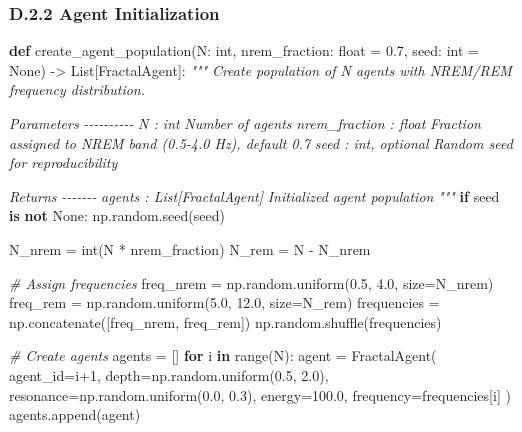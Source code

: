 \documentclass[
]{article}
\newenvironment{Shaded}{}{}
\newcommand{\BuiltInTok}[1]{\textcolor[rgb]{0.00,0.50,0.00}{#1}}
\newcommand{\CommentTok}[1]{\textcolor[rgb]{0.38,0.63,0.69}{\textit{#1}}}
\newcommand{\ControlFlowTok}[1]{\textcolor[rgb]{0.00,0.44,0.13}{\textbf{#1}}}
\newcommand{\DecValTok}[1]{\textcolor[rgb]{0.25,0.63,0.44}{#1}}
\newcommand{\FloatTok}[1]{\textcolor[rgb]{0.25,0.63,0.44}{#1}}
\newcommand{\KeywordTok}[1]{\textcolor[rgb]{0.00,0.44,0.13}{\textbf{#1}}}
\newcommand{\NormalTok}[1]{#1}
\newcommand{\OperatorTok}[1]{\textcolor[rgb]{0.40,0.40,0.40}{#1}}
\newcommand{\VariableTok}[1]{\textcolor[rgb]{0.10,0.09,0.49}{#1}}
\begin{document}
\subsubsection{D.2.2 Agent
Initialization}\label{d.2.2-agent-initialization}

\begin{Shaded}
\begin{Highlighting}[]
\KeywordTok{def}\NormalTok{ create\_agent\_population(N: }\BuiltInTok{int}\NormalTok{,}
\NormalTok{                           nrem\_fraction: }\BuiltInTok{float} \OperatorTok{=} \FloatTok{0.7}\NormalTok{,}
\NormalTok{                           seed: }\BuiltInTok{int} \OperatorTok{=} \VariableTok{None}\NormalTok{) }\OperatorTok{{-}\textgreater{}}\NormalTok{ List[FractalAgent]:}
    \CommentTok{"""}
\CommentTok{    Create population of N agents with NREM/REM frequency distribution.}

\CommentTok{    Parameters}
\CommentTok{    {-}{-}{-}{-}{-}{-}{-}{-}{-}{-}}
\CommentTok{    N : int}
\CommentTok{        Number of agents}
\CommentTok{    nrem\_fraction : float}
\CommentTok{        Fraction assigned to NREM band (0.5{-}4.0 Hz), default 0.7}
\CommentTok{    seed : int, optional}
\CommentTok{        Random seed for reproducibility}

\CommentTok{    Returns}
\CommentTok{    {-}{-}{-}{-}{-}{-}{-}}
\CommentTok{    agents : List[FractalAgent]}
\CommentTok{        Initialized agent population}
\CommentTok{    """}
    \ControlFlowTok{if}\NormalTok{ seed }\KeywordTok{is} \KeywordTok{not} \VariableTok{None}\NormalTok{:}
\NormalTok{        np.random.seed(seed)}

\NormalTok{    N\_nrem }\OperatorTok{=} \BuiltInTok{int}\NormalTok{(N }\OperatorTok{*}\NormalTok{ nrem\_fraction)}
\NormalTok{    N\_rem }\OperatorTok{=}\NormalTok{ N }\OperatorTok{{-}}\NormalTok{ N\_nrem}

    \CommentTok{\# Assign frequencies}
\NormalTok{    freq\_nrem }\OperatorTok{=}\NormalTok{ np.random.uniform(}\FloatTok{0.5}\NormalTok{, }\FloatTok{4.0}\NormalTok{, size}\OperatorTok{=}\NormalTok{N\_nrem)}
\NormalTok{    freq\_rem }\OperatorTok{=}\NormalTok{ np.random.uniform(}\FloatTok{5.0}\NormalTok{, }\FloatTok{12.0}\NormalTok{, size}\OperatorTok{=}\NormalTok{N\_rem)}
\NormalTok{    frequencies }\OperatorTok{=}\NormalTok{ np.concatenate([freq\_nrem, freq\_rem])}
\NormalTok{    np.random.shuffle(frequencies)}

    \CommentTok{\# Create agents}
\NormalTok{    agents }\OperatorTok{=}\NormalTok{ []}
    \ControlFlowTok{for}\NormalTok{ i }\KeywordTok{in} \BuiltInTok{range}\NormalTok{(N):}
\NormalTok{        agent }\OperatorTok{=}\NormalTok{ FractalAgent(}
\NormalTok{            agent\_id}\OperatorTok{=}\NormalTok{i}\OperatorTok{+}\DecValTok{1}\NormalTok{,}
\NormalTok{            depth}\OperatorTok{=}\NormalTok{np.random.uniform(}\FloatTok{0.5}\NormalTok{, }\FloatTok{2.0}\NormalTok{),}
\NormalTok{            resonance}\OperatorTok{=}\NormalTok{np.random.uniform(}\FloatTok{0.0}\NormalTok{, }\FloatTok{0.3}\NormalTok{),}
\NormalTok{            energy}\OperatorTok{=}\FloatTok{100.0}\NormalTok{,}
\NormalTok{            frequency}\OperatorTok{=}\NormalTok{frequencies[i]}
\NormalTok{        )}
\NormalTok{        agents.append(agent)}


\end{Highlighting}
\end{Shaded}
\end{document}
